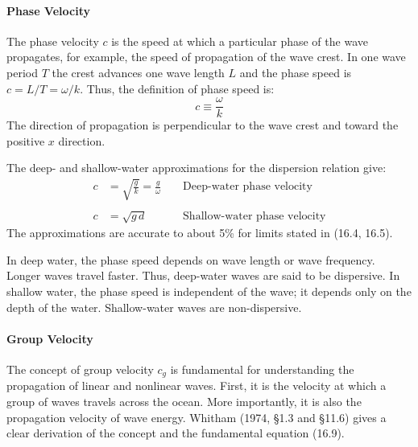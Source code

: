 \paragraph{Phase Velocity}
The phase velocity $c$ is the speed at which
a particular phase of the wave propagates, for example, the speed of propagation of the wave
crest. In one wave period $T$ the crest advances one wave length $L$ and the phase speed is
$c=L/T= \omega /k$. Thus, the definition of phase speed is:
   \begin{equation}
      c \equiv \frac {\omega}{k}
   \end{equation}
The direction of propagation is perpendicular to the wave crest and toward the
positive $x$ direction. 

The deep- and shallow-water approximations for the dispersion
relation give:
  \begin{align}
   c &= \sqrt{\frac{g}{k}} = \frac{g}{\omega} & & \text{ Deep-water phase
velocity} \\
   & &  & \nonumber \\
   c &=\sqrt{g\,d} & & \text{ Shallow-water phase velocity}
  \end{align}
The approximations are accurate to about 5\% for limits stated in (16.4, 16.5).

In deep water, the phase speed depends on wave length or wave frequency. Longer
waves travel faster. Thus, deep-water waves are said to be dispersive. In
shallow water, the phase speed is independent of the wave; it depends only on the
depth of the water. Shallow-water waves are non-dispersive.

\paragraph{Group Velocity}
The concept of group velocity $c_{g}$ is
fundamental for understanding the propagation of linear and nonlinear waves. First, it is the
velocity at which a group of waves travels across the ocean. More importantly, it is also the
propagation velocity of wave energy. Whitham (1974, \S 1.3 and \S 11.6) gives a clear
derivation of the concept and the fundamental equation (16.9).

